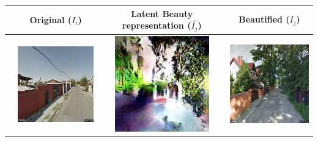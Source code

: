 	\begin{table}\sffamily
	\begin{tabular}{l*3{C}@{}}
		\toprule
		 & Original ($I_i$) & Latent Beauty representation ($\hat{I_j}$) & Beautified ($I_j$) \\ 
		\midrule
		& \includegraphics[width=11em]{Plot/examples/u_9} & \includegraphics[width=11em]{Plot/examples/t_9} &  \includegraphics[width=11em]{Plot/examples/b_9} \\ 

\end{tabular}
\end{table}
